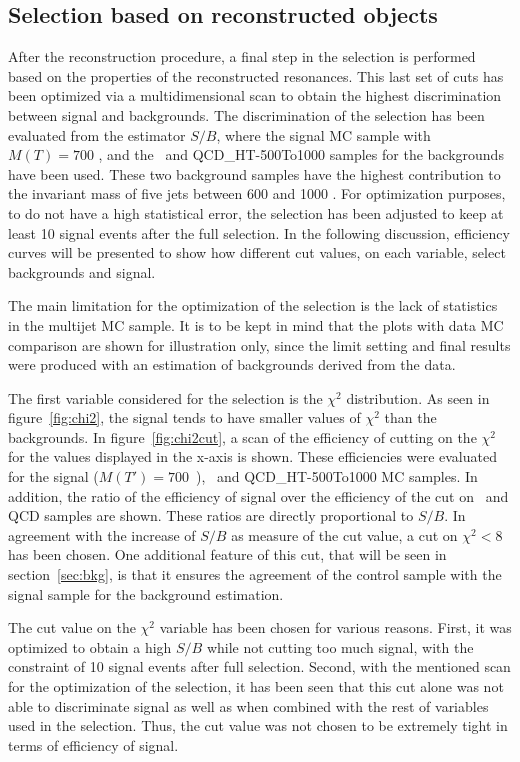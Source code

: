 \subsection{Selection based on reconstructed objects}
\label{sec:finalsel}

After the reconstruction procedure, a final step in the selection is performed based on the properties of the reconstructed resonances. This last set of cuts has been optimized via a multidimensional scan to obtain the highest discrimination between signal and backgrounds. The discrimination of the selection has been evaluated from the estimator $S/B$, where the signal MC sample with $M(T)=700$ \GeVcc, and the \ttbar~and QCD\_HT-500To1000 samples for the backgrounds have been used. These two background samples have the highest contribution to the invariant mass of five jets between 600 and 1000 \GeVcc. For optimization purposes, to do not have a high statistical error, the selection has been adjusted to keep at least 10 signal events after the full selection. In the following discussion, efficiency curves will be presented to show how different cut values, on each variable, select backgrounds and signal. 

The main limitation for the optimization of the selection is the lack of statistics in the multijet MC sample. It is to be kept in mind that the plots with data MC comparison are shown for illustration only, since the limit setting and final results were produced with an estimation of backgrounds derived from the data.

The first variable considered for the selection is the $\chi^{2}$ distribution. As seen in figure~\ref{fig:chi2}, the signal tends to have smaller values of $\chi^{2}$ than the backgrounds. In figure~\ref{fig:chi2cut}, a scan of the efficiency of cutting on the $\chi^{2}$ for the values displayed in the x-axis is shown. These efficiencies were evaluated for the signal (${M(T')=700}$~\GeVcc), \ttbar~and QCD\_HT-500To1000 MC samples. In addition, the ratio of the efficiency of signal over the efficiency of the cut on \ttbar~and QCD samples are shown. These ratios are directly proportional to $S/B$. In agreement with the increase of $S/B$ as measure of the cut value, a cut on $\chi^{2}<8$ has been chosen. One additional feature of this cut, that will be seen in section~\ref{sec:bkg}, is that it ensures the agreement of the control sample with the signal sample for the background estimation. 

The cut value on the $\chi^{2}$ variable has been chosen for various reasons. First, it was optimized to obtain a high $S/B$ while not cutting too much signal, with the constraint of 10 signal events after full selection. Second, with the mentioned scan for the optimization of the selection, it has been seen that this cut alone was not able to discriminate signal as well as when combined with the rest of variables used in the selection. Thus, the cut value was not chosen to be extremely tight in terms of efficiency of signal.


